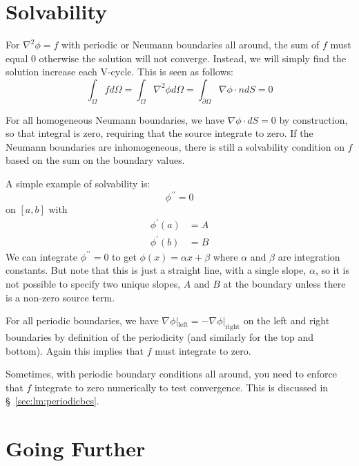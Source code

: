 \section{Solvability}
\label{sec:multigrid:solvability}

For $\nabla^2 \phi = f$ with periodic or
Neumann boundaries all around, the sum of $f$ must equal $0$
otherwise the solution will not converge.  Instead, we will simply
find the solution increase each V-cycle.  This is seen as follows:
\begin{equation}
  \int_\Omega f d\Omega = \int_\Omega \nabla^2 \phi d\Omega =
  \int_{\partial \Omega} \nabla \phi \cdot n dS = 0
\end{equation}

For all homogeneous Neumann boundaries, we have $\nabla \phi \cdot dS
= 0$ by construction, so that integral is zero, requiring that the
source integrate to zero.  If the Neumann boundaries are inhomogeneous,
there is still a solvability condition on $f$ based on the sum on
the boundary values.

A simple example of solvability is:
\begin{equation}
\phi^{\prime\prime} = 0
\end{equation}
on $[a, b]$ with 
\begin{align}
\phi^\prime(a) &= A \\
\phi^\prime(b) &= B
\end{align}
We can integrate $\phi^{\prime\prime} = 0$ to get $\phi(x) = \alpha x
+ \beta$ where $\alpha$ and $\beta$ are integration constants.  But
note that this is just a straight line, with a single slope, $\alpha$,
so it is not possible to specify two unique slopes, $A$ and $B$ at the
boundary unless there is a non-zero source term.

For all periodic boundaries, we have $\nabla \phi
|_\mathrm{left} = -\nabla \phi |_\mathrm{right}$ on the left and right
boundaries by definition of the periodicity (and similarly for the top
and bottom).  Again this implies that $f$ must integrate to zero.

Sometimes, with periodic boundary conditions all around, you need to
enforce that $f$ integrate to zero numerically to test convergence.
This is discussed in \S~\ref{sec:lm:periodicbcs}.



\section{Going Further}

